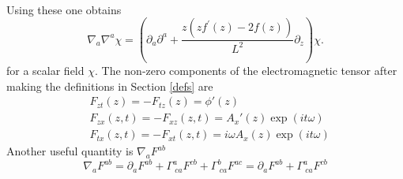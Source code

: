 \documentclass[12pt]{report}
\renewcommand{\i}{\ensuremath{i}}
\newcommand{\At}{\ensuremath{{\phi}}}
\begin{document}
\begin{appendices}
\begin{equation}
\begin{split}
\end{split}\label{CSsum}
\end{equation}
Using these one obtains
\begin{equation}
 \nabla_a\nabla^a\chi=\left(\partial_a\partial^a+\frac{z \left(z f^\prime\left(z\right) - 2 f\left(z\right)\right)}{L^{2}}\partial_z\right)\chi.
\end{equation}
for a scalar field $\chi$.
The non-zero components of the electromagnetic tensor after making the definitions in Section \ref{defs} are
\begin{equation}
\begin{split}
 &F_{zt}(z)=-F_{tz}(z)=\At'(z)\\
 &F_{zx}(z,t)=-F_{xz}(z,t)=A_x'(z)\exp(\i t \omega)\\
 &F_{tx}(z,t)=-F_{xt}(z,t)=\i\omega A_x(z)\exp(\i t \omega)
\end{split}
\end{equation}
Another useful quantity is
$\nabla_aF^{ab}$
\begin{equation}
 \nabla_aF^{ab}=\partial_aF^{ab}+\Gamma^a_{\ ca}F^{cb}+\Gamma^b_{\ ca}F^{ac}=\partial_aF^{ab}+\Gamma^a_{\ ca}F^{cb}
\end{equation}
\end{appendices}


\end{document}
